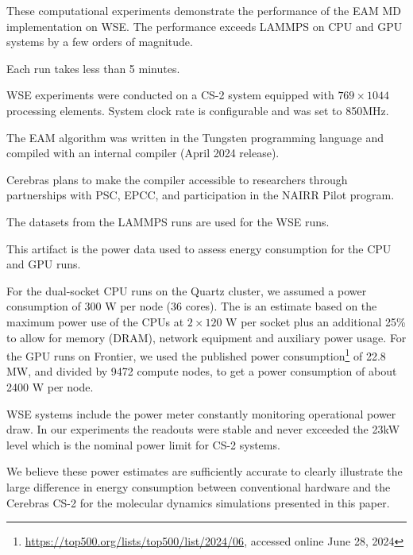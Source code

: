 \documentclass[conference]{IEEEtran}
\begin{document}
\artexp

These computational experiments demonstrate the performance of the EAM MD implementation on WSE. The performance exceeds LAMMPS on CPU and GPU systems by a few orders of magnitude.

\arttime

Each run takes less than 5 minutes.

\artin


WSE experiments were conducted on a CS-2 system equipped with $769\times 1044$ processing elements. System clock rate is configurable and was set to 850MHz. 

The EAM algorithm was written in the Tungsten programming language and compiled with an internal compiler (April 2024 release). 

Cerebras plans to make the compiler accessible to researchers through partnerships with PSC, EPCC, and participation in the NAIRR Pilot program.


The datasets from the LAMMPS runs are used for the WSE runs.

\newartifact

\artrel

This artifact is the power data used to assess energy consumption for the CPU and GPU runs.

\artexp

For the dual-socket CPU runs on the Quartz cluster, we assumed a power consumption of 300 W per node (36 cores). The is an estimate based on the maximum power use of the CPUs at $2\times 120$ W per socket plus an additional 25\% to allow for memory (DRAM), network equipment and auxiliary power usage. For the GPU runs on Frontier, we used the published power consumption\footnote{\url{https://top500.org/lists/top500/list/2024/06}, accessed online June 28, 2024} of 22.8 MW, and divided by 9472 compute nodes, to get a power consumption of about 2400 W per node.

WSE systems include the power meter constantly monitoring operational power draw. In our experiments the readouts were stable and never exceeded the 23kW level which is the nominal power limit for CS-2 systems.

We believe these power estimates are sufficiently accurate to clearly illustrate the large difference in energy consumption between conventional hardware and the Cerebras CS-2 for the molecular dynamics simulations presented in this paper.
\end{document}
